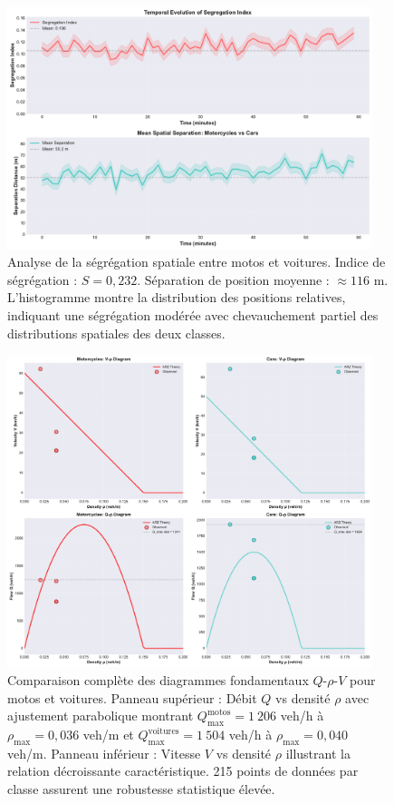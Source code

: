 \begin{figure}[H]
    \centering
    \includegraphics[width=0.95\textwidth]{SPRINT4_DELIVERABLES/figures/segregation_analysis.pdf}
    \caption{Analyse de la ségrégation spatiale entre motos et voitures.
        Indice de ségrégation : $S = 0{,}232$.
        Séparation de position moyenne : $\approx 116$ m.
        L'histogramme montre la distribution des positions relatives, indiquant une ségrégation modérée avec chevauchement partiel des distributions spatiales des deux classes.}
    \label{fig:segregation_analysis}
\end{figure}

\begin{figure}[H]
    \centering
    \includegraphics[width=0.95\textwidth]{SPRINT4_DELIVERABLES/figures/fundamental_diagrams_comparison.pdf}
    \caption{Comparaison complète des diagrammes fondamentaux $Q$-$\rho$-$V$ pour motos et voitures.
        Panneau supérieur : Débit $Q$ vs densité $\rho$ avec ajustement parabolique montrant $Q_{\max}^{\text{motos}} = 1~206$ veh/h à $\rho_{\max} = 0{,}036$ veh/m et $Q_{\max}^{\text{voitures}} = 1~504$ veh/h à $\rho_{\max} = 0{,}040$ veh/m.
        Panneau inférieur : Vitesse $V$ vs densité $\rho$ illustrant la relation décroissante caractéristique.
        215 points de données par classe assurent une robustesse statistique élevée.}
    \label{fig:fd_comparison_real}
\end{figure}

